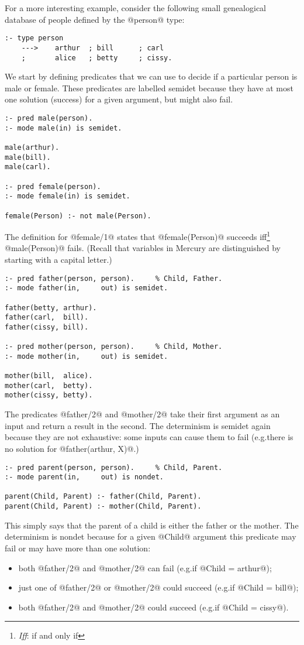 \documentclass[a4paper,11pt,notitlepage,onecolumn]{article}
\makeatletter
\newcommand{\eg}%
{e.g.\@ }
\makeatother
\begin{document}
For a more interesting example, consider the following small
genealogical database of people defined by the @person@ type:
\begin{verbatim}
:- type person
    --->    arthur  ; bill      ; carl
    ;       alice   ; betty     ; cissy.
\end{verbatim}
We start by defining predicates that we can use to decide if a
particular person is male or female.  These predicates are
labelled semidet because they have at most one solution
(success) for a given argument, but might also fail.
\begin{verbatim}
:- pred male(person).
:- mode male(in) is semidet.

male(arthur).
male(bill).
male(carl).

:- pred female(person).
:- mode female(in) is semidet.

female(Person) :- not male(Person).
\end{verbatim}
The definition for @female/1@ states that @female(Person)@ succeeds
iff\footnote{\emph{Iff}: if and only if} @male(Person)@ fails.  (Recall
that variables in Mercury are distinguished by starting with a capital
letter.)
\begin{verbatim}
:- pred father(person, person).     % Child, Father.
:- mode father(in,     out) is semidet.

father(betty, arthur).
father(carl,  bill).
father(cissy, bill).

:- pred mother(person, person).     % Child, Mother.
:- mode mother(in,     out) is semidet.

mother(bill,  alice).
mother(carl,  betty).
mother(cissy, betty).
\end{verbatim}
The predicates @father/2@ and @mother/2@ take their first argument
as an input and return a result in the second.  The
determinism is semidet again because they are not exhaustive:
some inputs can cause them to fail (\eg there is no solution
for @father(arthur, X)@.)
\begin{verbatim}
:- pred parent(person, person).     % Child, Parent.
:- mode parent(in,     out) is nondet.

parent(Child, Parent) :- father(Child, Parent).
parent(Child, Parent) :- mother(Child, Parent).
\end{verbatim}
This simply says that the parent of a child is either the
father or the mother.  The determinism is nondet because for a
given @Child@ argument this predicate may fail or may have more
than one solution:
\begin{itemize}
\item both @father/2@ and @mother/2@ can fail
(\eg if @Child = arthur@);
\item just one of @father/2@ or @mother/2@ could succeed
(\eg if @Child = bill@);
\item both @father/2@ and @mother/2@ could succeed
(\eg if @Child = cissy@).
\end{itemize}
\end{document}

